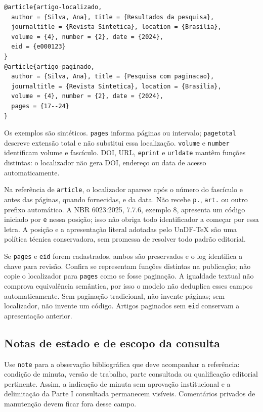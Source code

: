\begin{lstlisting}
@article{artigo-localizado,
  author = {Silva, Ana}, title = {Resultados da pesquisa},
  journaltitle = {Revista Sintetica}, location = {Brasilia},
  volume = {4}, number = {2}, date = {2024},
  eid = {e000123}
}
@article{artigo-paginado,
  author = {Silva, Ana}, title = {Pesquisa com paginacao},
  journaltitle = {Revista Sintetica}, location = {Brasilia},
  volume = {4}, number = {2}, date = {2024},
  pages = {17--24}
}
\end{lstlisting}

Os exemplos são sintéticos. \texttt{pages} informa páginas ou intervalo;
\texttt{pagetotal} descreve extensão total e não substitui essa localização.
\texttt{volume} e \texttt{number} identificam volume e fascículo.
DOI, URL, \texttt{eprint} e \texttt{urldate} mantêm funções distintas:
o localizador não gera DOI, endereço ou data de acesso automaticamente.

Na referência de \texttt{article}, o localizador aparece após o número do
fascículo e antes das páginas, quando fornecidas, e da data. Não recebe
\texttt{p.}, \texttt{art.} ou outro prefixo automático. A NBR 6023:2025,
7.7.6, exemplo 8, apresenta um código iniciado por \texttt{e} nessa posição;
isso não obriga todo identificador a começar por essa letra. A posição e
a apresentação literal adotadas pelo UnDF-TeX são uma política técnica
conservadora, sem promessa de resolver todo padrão editorial.

Se \texttt{pages} e \texttt{eid} forem cadastrados, ambos são preservados
e o log identifica a chave para revisão. Confira se representam funções
distintas na publicação; não copie o localizador para \texttt{pages} como
se fosse paginação. A igualdade textual não comprova equivalência semântica,
por isso o modelo não deduplica esses campos automaticamente. Sem paginação
tradicional, não invente páginas; sem localizador, não invente um código.
Artigos paginados sem \texttt{eid} conservam a apresentação anterior.

\subsection*{Notas de estado e de escopo da consulta}

Use \texttt{note} para a observação bibliográfica que deve acompanhar a
referência: condição de minuta, versão de trabalho, parte consultada ou
qualificação editorial pertinente. Assim, a indicação de minuta sem aprovação
institucional e a delimitação da Parte I consultada permanecem visíveis.
Comentários privados de manutenção devem ficar fora desse campo.

